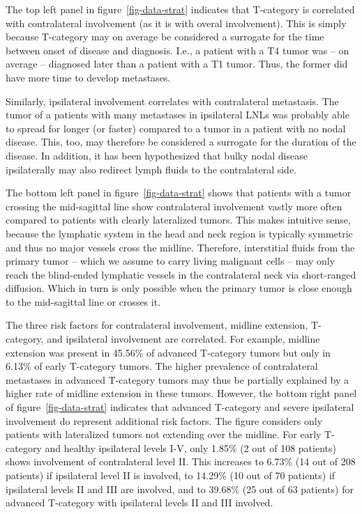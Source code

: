 \documentclass[
  sn-mathphys-num,
]{sn-jnl}
\begin{document}
The top left panel in figure~\ref{fig-data-strat} indicates that
T-category is correlated with contralateral involvement (as it is with
overal involvement). This is simply because T-category may on average be
considered a surrogate for the time between onset of disease and
diagnosis. I.e., a patient with a T4 tumor was -- on average --
diagnosed later than a patient with a T1 tumor. Thus, the former did
have more time to develop metastases.

Similarly, ipsilateral involvement correlates with contralateral
metastasis. The tumor of a patients with many metastases in ipsilateral
LNLs was probably able to spread for longer (or faster) compared to a
tumor in a patient with no nodal disease. This, too, may therefore be
considered a surrogate for the duration of the disease. In addition, it
has been hypothesized that bulky nodal disease ipsilaterally may also
redirect lymph fluids to the contralateral side.

The bottom left panel in figure~\ref{fig-data-strat} shows that patients
with a tumor crossing the mid-sagittal line show contralateral
involvement vastly more often compared to patients with clearly
lateralized tumors. This makes intuitive sense, because the lymphatic
system in the head and neck region is typically symmetric and thus no
major vessels cross the midline. Therefore, interstitial fluids from the
primary tumor -- which we assume to carry living malignant cells -- may
only reach the blind-ended lymphatic vessels in the contralateral neck
via short-ranged diffusion. Which in turn is only possible when the
primary tumor is close enough to the mid-sagittal line or crosses it.

The three risk factors for contralateral involvement, midline extension,
T-category, and ipsilateral involvement are correlated. For example,
midline extension was present in 45.56\% of advanced T-category tumors
but only in 6.13\% of early T-category tumors. The higher prevalence of
contralateral metastases in advanced T-category tumors may thus be
partially explained by a higher rate of midline extension in these
tumors. However, the bottom right panel of figure~\ref{fig-data-strat}
indicates that advanced T-category and severe ipsilateral involvement do
represent additional risk factors. The figure considers only patients
with lateralized tumors not extending over the midline. For early
T-category and healthy ipsilateral levels I-V, only 1.85\% (2 out of 108
patients) shows involvement of contralateral level II. This increases to
6.73\% (14 out of 208 patients) if ipsilateral level II is involved, to
14.29\% (10 out of 70 patients) if ipsilateral levels II and III are
involved, and to 39.68\% (25 out of 63 patients) for advanced T-category
with ipsilateral levels II and III involved.
\end{document}
